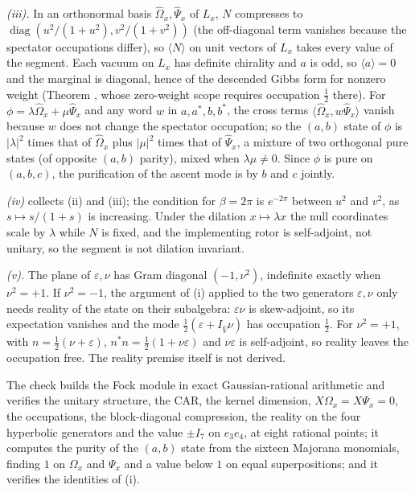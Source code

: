 \emph{(iii).} In an orthonormal basis $\hat\Omega_{x}, \hat\Psi_{x}$ of $L_{x}$, $N$ compresses to $\operatorname{diag}(u^{2}/(1+u^{2}), v^{2}/(1+v^{2}))$ (the off-diagonal term vanishes because the spectator occupations differ), so $\langle N \rangle$ on unit vectors of $L_{x}$ takes every value of the segment. Each vacuum on $L_{x}$ has definite chirality and $a$ is odd, so $\langle a \rangle = 0$ and the marginal is diagonal, hence of the descended Gibbs form for nonzero weight (Theorem , whose zero-weight scope requires occupation $\tfrac12$ there). For $\phi = \lambda\hat\Omega_{x} + \mu\hat\Psi_{x}$ and any word $w$ in $a, a^{*}, b, b^{*}$, the cross terms $\langle \hat\Omega_{x}, w\hat\Psi_{x}\rangle$ vanish because $w$ does not change the spectator occupation; so the $(a,b)$ state of $\phi$ is $|\lambda|^{2}$ times that of $\hat\Omega_{x}$ plus $|\mu|^{2}$ times that of $\hat\Psi_{x}$, a mixture of two orthogonal pure states (of opposite $(a,b)$ parity), mixed when $\lambda\mu \ne 0$. Since $\phi$ is pure on $(a, b, c)$, the purification of the ascent mode is by $b$ and $c$ jointly.

\emph{(iv)} collects (ii) and (iii); the condition for $\beta = 2\pi$ is $e^{-2\pi}$ between $u^{2}$ and $v^{2}$, as $s \mapsto s/(1+s)$ is increasing. Under the dilation $x \mapsto \lambda x$ the null coordinates scale by $\lambda$ while $N$ is fixed, and the implementing rotor is self-adjoint, not unitary, so the segment is not dilation invariant.

\emph{(v).} The plane of $\varepsilon, \nu$ has Gram diagonal $(-1, \nu^{2})$, indefinite exactly when $\nu^{2} = +1$. If $\nu^{2} = -1$, the argument of (i) applied to the two generators $\varepsilon, \nu$ only needs reality of the state on their subalgebra: $\varepsilon\nu$ is skew-adjoint, so its expectation vanishes and the mode $\tfrac12(\varepsilon + I_{\hat V}\nu)$ has occupation $\tfrac12$. For $\nu^{2} = +1$, with $n = \tfrac12(\nu + \varepsilon)$, $n^{*}n = \tfrac12(1 + \nu\varepsilon)$ and $\nu\varepsilon$ is self-adjoint, so reality leaves the occupation free. The reality premise itself is not derived.

The check builds the Fock module in exact Gaussian-rational arithmetic and verifies the unitary structure, the CAR, the kernel dimension, $X\Omega_{x} = X\Psi_{x} = 0$, the occupations, the block-diagonal compression, the reality on the four hyperbolic generators and the value $\pm I_{7}$ on $e_{3}e_{4}$, at eight rational points; it computes the purity of the $(a,b)$ state from the sixteen Majorana monomials, finding $1$ on $\Omega_{x}$ and $\Psi_{x}$ and a value below $1$ on equal superpositions; and it verifies the identities of (i).
